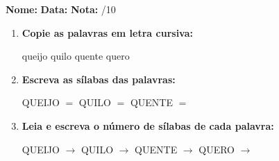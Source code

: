 \begin{exercicio}



\noindent\textbf{Nome:} \underline{\hspace{3.2cm}} \quad \textbf{Data:} \underline{\hspace{1.6cm}} \quad \textbf{Nota:} \underline{\hspace{0.9cm}}/10


\begin{enumerate}

  \item \textbf{Copie as palavras em letra cursiva:}
  \begin{center}
  queijo \quad quilo \quad quente \quad quero
  \end{center}
  \begin{center}
  \underline{\hspace{2.4cm}} \quad \underline{\hspace{2.4cm}} \quad \underline{\hspace{2.4cm}} \quad \underline{\hspace{2.4cm}}
  \end{center}

  \item \textbf{Escreva as sílabas das palavras:}
  \begin{center}
  QUEIJO $=$ \underline{\hspace{1.5cm}} \underline{\hspace{1.5cm}} \quad QUILO $=$ \underline{\hspace{1.5cm}} \underline{\hspace{1.5cm}} \quad QUENTE $=$ \underline{\hspace{1.5cm}} \underline{\hspace{1.5cm}}
  \end{center}

  \item \textbf{Leia e escreva o número de sílabas de cada palavra:}
  \begin{center}
  QUEIJO $\rightarrow$ \underline{\hspace{0.9cm}} \quad QUILO $\rightarrow$ \underline{\hspace{0.9cm}} \quad QUENTE $\rightarrow$ \underline{\hspace{0.9cm}} \quad QUERO $\rightarrow$ \underline{\hspace{0.9cm}}
  \end{center}


\end{enumerate}
\end{exercicio}
